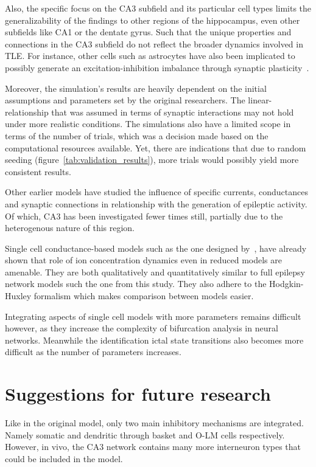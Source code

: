 Also, the specific focus on the CA3 subfield and its particular cell types limits the generalizability of the findings to other regions of the hippocampus,
even other subfields like CA1 or the dentate gyrus. Such that the unique properties and connections in the CA3 subfield do not
reflect the broader dynamics involved in TLE\@. For instance, other cells such as astrocytes have also been implicated to possibly generate
an excitation-inhibition imbalance through synaptic plasticity~\parencite{bonanscoPlasticityHippocampalExcitatoryInhibitory2016}.

Moreover, the simulation's results are heavily dependent on the initial assumptions and parameters set by the original researchers.
The linear-relationship that was assumed in terms of synaptic interactions may not hold under more realistic conditions.
The simulations also have a limited scope in terms of the number of trials, which was a decision made based on the computational resources available.
Yet, there are indications that due to random seeding (figure~\ref{tab:validation_results}), more trials would possibly yield more consistent results.

Other earlier models have studied the influence of specific currents, conductances and synaptic connections in relationship with the generation
of epileptic activity. Of which, CA3 has been investigated fewer times still, partially due to the heterogenous nature of this region.

Single cell conductance-based models such as the one designed by~\textcite{cressmanInfluenceSodiumPotassium2009}, have already shown that role of ion concentration dynamics
even in reduced models are amenable. They are both qualitatively and quantitatively similar to full epilepsy network models such the one from this study. They also
adhere to the Hodgkin-Huxley formalism which makes comparison between models easier.

Integrating aspects of single cell models with more parameters remains difficult however, as they increase the complexity of bifurcation analysis in neural networks.
Meanwhile the identification ictal state transitions also becomes more difficult as the number of parameters increases.

\section{Suggestions for future research}
Like in the original model, only two main inhibitory mechanisms are integrated. Namely somatic and dendritic through basket and O-LM cells respectively.
However, in vivo, the CA3 network contains many more interneuron types that could be included in the model.

